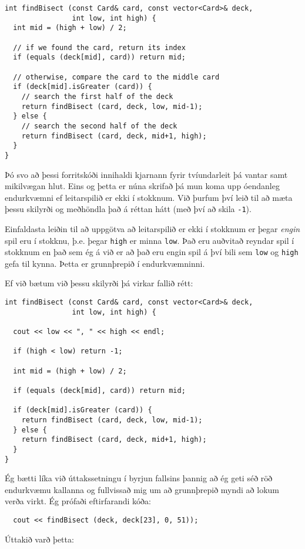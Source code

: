 \begin{verbatim}
int findBisect (const Card& card, const vector<Card>& deck,
                int low, int high) {
  int mid = (high + low) / 2;

  // if we found the card, return its index
  if (equals (deck[mid], card)) return mid;

  // otherwise, compare the card to the middle card
  if (deck[mid].isGreater (card)) {
    // search the first half of the deck
    return findBisect (card, deck, low, mid-1);
  } else {
    // search the second half of the deck
    return findBisect (card, deck, mid+1, high);
  }
}
\end{verbatim}
%
Þó svo að þessi forritskóði innihaldi kjarnann fyrir tvíundarleit þá vantar samt mikilvægan hlut.
Eins og þetta er núna skrifað þá mun koma upp óendanleg endurkvæmni ef leitarspilið er ekki í stokknum.
Við þurfum því leið til að mæta þessu skilyrði og meðhöndla það á réttan hátt (með því að skila {\tt -1}).


Einfaldasta leiðin til að uppgötva að leitarspilið er ekki í stokknum er þegar 
{\em engin} spil eru í stokknu, þ.e. þegar {\tt high} er minna {\tt low}.
Það eru auðvitað reyndar spil í stokknum en það sem ég á við er að það eru engin spil á því bili sem 
{\tt low} og {\tt high} gefa til kynna.
Þetta er grunnþrepið í endurkvæmninni.

Ef við bætum við þessu skilyrði þá virkar fallið rétt:

\begin{verbatim}
int findBisect (const Card& card, const vector<Card>& deck,
                int low, int high) {

  cout << low << ", " << high << endl;

  if (high < low) return -1;

  int mid = (high + low) / 2;

  if (equals (deck[mid], card)) return mid;

  if (deck[mid].isGreater (card)) {
    return findBisect (card, deck, low, mid-1);
  } else {
    return findBisect (card, deck, mid+1, high);
  }
}
\end{verbatim}
%
Ég bætti líka við úttakssetningu í byrjun fallsins þannig að ég geti séð röð endurkvæmu kallanna
og fullvissað mig um að grunnþrepið myndi að lokum verða virkt.
Ég prófaði eftirfarandi kóða:

\begin{verbatim}
  cout << findBisect (deck, deck[23], 0, 51));
\end{verbatim}
%
Úttakið varð þetta: 

